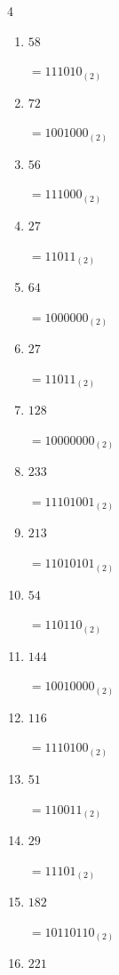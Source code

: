 \begin{multicols}{4}
\begin{enumerate}
        $=10100011_{(2)}$

  \item $58$

        $=111010_{(2)}$

  \item $72$

        $=1001000_{(2)}$

  \item $56$

        $=111000_{(2)}$

\columnbreak %

  \item $27$

        $=11011_{(2)}$

  \item $64$

        $=1000000_{(2)}$

  \item $27$

        $=11011_{(2)}$

  \item $128$

        $=10000000_{(2)}$

  \item $233$

        $=11101001_{(2)}$

  \item $213$

        $=11010101_{(2)}$

  \item $54$

        $=110110_{(2)}$

  \item $144$

        $=10010000_{(2)}$

  \item $116$

        $=1110100_{(2)}$

  \item $51$

        $=110011_{(2)}$

  \item $29$

        $=11101_{(2)}$

  \item $182$

        $=10110110_{(2)}$

  \item $221$


\end{enumerate}
\end{multicols}
